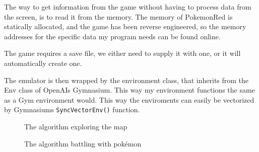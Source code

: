 \documentclass{article}
\begin{document}
	The way to get information from the game without having to process data from the screen, is to read it from the memory. The memory of PokemonRed is statically allocated, and the game has been reverse engineered, so the memory addresses for the specific data my program needs can be found online.


	The game requires a save file, we either need to supply it with one, or it will automatically create one.


	The emulator is then wrapped by the environment class, that inherits from the Env class of OpenAIs Gymnasium. This way my environment functions the same as a Gym environment would. This way the enviroments can easily be vectorized by Gymnasiums {\tt SyncVectorEnv()} function.

\begin{figure}%
    \centering
    \qquad
    \caption{The algorithm exploring the map}%
    \label{fig:exploration}%

    \centering
    \qquad
    \caption{The algorithm battling with pokémon}%
    \label{fig:battle}%


\end{figure}
\end{document}
